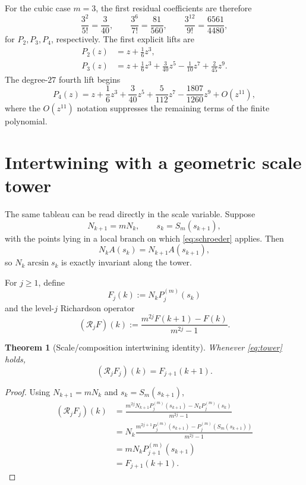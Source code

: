 \documentclass[11pt]{article}
\newtheorem{theorem}{Theorem}[section]
\theoremstyle{remark}
\newcommand{\R}{\mathcal R}
\begin{document}
For the cubic case $m=3$, the first residual coefficients are therefore
\[
\frac{3^2}{5!}=\frac3{40},\qquad
\frac{3^6}{7!}=\frac{81}{560},\qquad
\frac{3^{12}}{9!}=\frac{6561}{4480},
\]
for $P_2,P_3,P_4$, respectively.  The first explicit lifts are
\begin{align}
P_2(z)&=z+\frac16z^3,\label{eq:P2}\\
P_3(z)&=z+\frac16z^3+\frac3{40}z^5
-\frac1{10}z^7+\frac2{45}z^9.\label{eq:P3}
\end{align}
The degree-$27$ fourth lift begins
\begin{equation}
P_4(z)
=z+\frac16z^3+\frac3{40}z^5+\frac5{112}z^7
-\frac{1807}{1260}z^9+O(z^{11}),
\label{eq:P4}
\end{equation}
where the $O(z^{11})$ notation suppresses the remaining terms of the finite
polynomial.

\section{Intertwining with a geometric scale tower}
\label{sec:tower}

The same tableau can be read directly in the scale variable.  Suppose
\begin{equation}
N_{k+1}=mN_k,
\qquad
s_k=S_m(s_{k+1}),
\label{eq:tower}
\end{equation}
with the points lying in a local branch on which \eqref{eq:schroeder} applies.
Then
\begin{equation}
N_kA(s_k)=N_{k+1}A(s_{k+1}),
\label{eq:invariant}
\end{equation}
so $N_k\arcsin s_k$ is exactly invariant along the tower.

For $j\ge1$, define
\[
F_j(k):=N_kP^{(m)}_j(s_k)
\]
and the level-$j$ Richardson operator
\begin{equation}
(\R_jF)(k)
:=
\frac{m^{2j}F(k+1)-F(k)}{m^{2j}-1}.
\label{eq:Rj}
\end{equation}

\begin{theorem}[Scale/composition intertwining identity]
\label{thm:intertwining}
Whenever \eqref{eq:tower} holds,
\begin{equation}
(\R_jF_j)(k)=F_{j+1}(k+1).
\label{eq:intertwining}
\end{equation}
\end{theorem}

\begin{proof}
Using $N_{k+1}=mN_k$ and $s_k=S_m(s_{k+1})$,
\begin{align*}
(\R_jF_j)(k)
&=
\frac{m^{2j}N_{k+1}P^{(m)}_j(s_{k+1})
      -N_kP^{(m)}_j(s_k)}{m^{2j}-1}\\
&=N_k
\frac{m^{2j+1}P^{(m)}_j(s_{k+1})
      -P^{(m)}_j(S_m(s_{k+1}))}{m^{2j}-1}\\
&=mN_kP^{(m)}_{j+1}(s_{k+1})\\
&=F_{j+1}(k+1).
\end{align*}
\end{proof}
\end{document}
